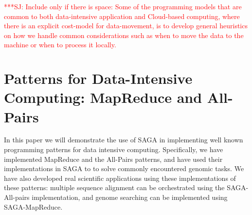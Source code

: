 \documentclass[conference,final]{IEEEtran}
\newcommand{\jhanote}[1]{ {\textcolor{red} { ***SJ: #1 }}}
\newcommand{\jhanote}[1]{}
\begin{document}




\jhanote{Include only if there is space: Some of the programming
  models that are common to both data-intensive application and
  Cloud-based computing, where there is an explicit cost-model for
  data-movement, is to develop general heuristics on how we handle
  common considerations such as when to move the data to the machine
  or when to process it locally.}

\section{Patterns for Data-Intensive Computing: MapReduce and
  All-Pairs}

In this paper we will demonstrate the use of SAGA in implementing well
known programming patterns for data intensive computing.
Specifically, we have implemented MapReduce and the All-Pairs
patterns, and have used their implementations in SAGA to to solve
commonly encountered genomic tasks.  We have also developed real
scientific applications using these implementations of these patterns:
multiple sequence alignment can be orchestrated using the
SAGA-All-pairs implementation, and genome searching can be implemented
using SAGA-MapReduce.

\end{document}
